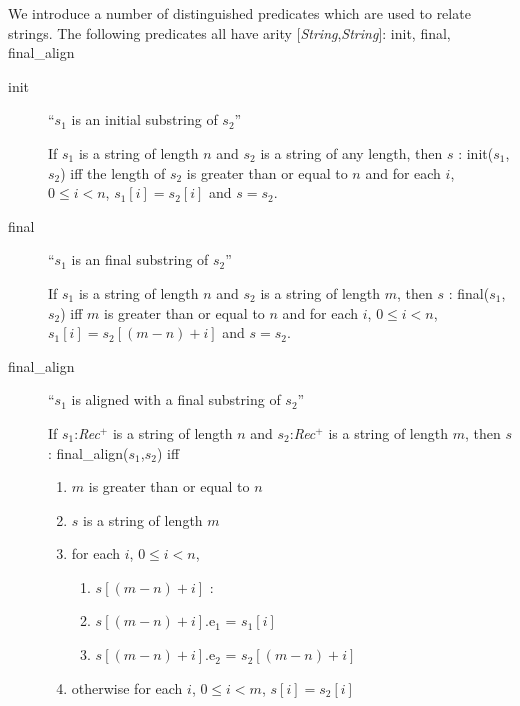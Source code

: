 We introduce a number of distinguished predicates which are used to
relate strings.  The following predicates all have arity
[\textit{String},\textit{String}]: init, final, final\_align
\begin{description}
\item[init] ``$s_1$ is an initial substring of $s_2$''

If $s_1$ is a string of length $n$ and $s_2$ is a string of any
length, then $s$ : init($s_1$,$s_2$) iff the length of $s_2$ is
greater than or equal to $n$ and for each $i$, $0\leq i<n$,
$s_1[i]=s_2[i]$ and $s=s_2$.

\item[final] ``$s_1$ is an final substring of $s_2$''

If $s_1$ is a string of length $n$ and $s_2$ is a string of 
length $m$, then $s$ : final($s_1$,$s_2$) iff $m$ is
greater than or equal to $n$ and for each $i$, $0\leq i<n$,
$s_1[i]=s_2[(m-n)+i]$ and $s=s_2$.

\item[final\_align] ``$s_1$ is aligned with a final substring of
  $s_2$''

If $s_1$:\textit{Rec}$^+$ is a string of length $n$ and $s_2$:\textit{Rec}$^+$ is a string of 
length $m$, then $s$ : final\_align($s_1$,$s_2$) iff 
\begin{enumerate} 
 
\item $m$ is
greater than or equal to $n$ 
 
\item  $s$ is a string of length $m$

\item for each
$i$, $0\leq i<n$, 

\begin{enumerate} 
 
\item  $s[(m-n)+i]$ :
\item  $s[(m-n)+i]$.e$_1$ =
$s_1[i]$

\item $s[(m-n)+i]$.e$_2$ = $s_2[(m-n)+i]$
 
\end{enumerate} 

\item  otherwise for each
$i$, $0\leq i<m$, $s[i]=s_2[i]$ 
 
\end{enumerate} 


\end{description}

